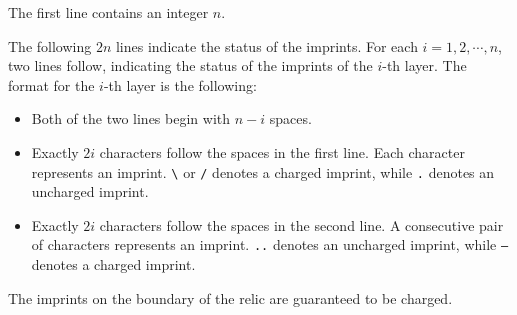 The first line contains an integer $n$.

The following $2n$ lines indicate the status of the imprints.
For each $i = 1,2,\cdots,n$, two lines follow, indicating the status of the imprints of the $i$-th layer.
The format for the $i$-th layer is the following:

\begin{itemize}
\item Both of the two lines begin with $n-i$ spaces.
\item Exactly $2i$ characters follow the spaces in the first line. Each character represents an imprint. \texttt{\textbackslash} or \texttt{/} denotes a charged imprint, while \texttt{.} denotes an uncharged imprint.
\item Exactly $2i$ characters follow the spaces in the second line. A consecutive pair of characters represents an imprint. \texttt{..} denotes an uncharged imprint, while \texttt{--} denotes a charged imprint.
\end{itemize}

The imprints on the boundary of the relic are guaranteed to be charged.